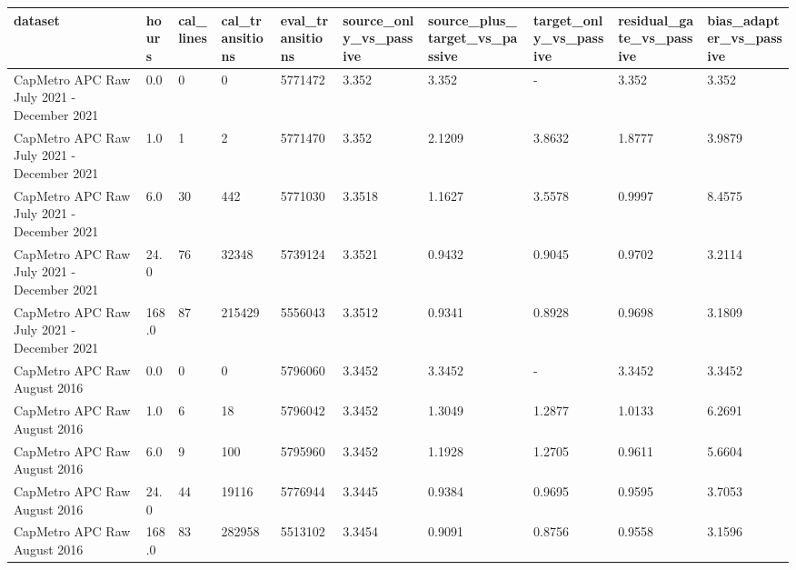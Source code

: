 \begin{tabular}{llllllllll}
\toprule
dataset & hours & cal\_lines & cal\_transitions & eval\_transitions & source\_only\_vs\_passive & source\_plus\_target\_vs\_passive & target\_only\_vs\_passive & residual\_gate\_vs\_passive & bias\_adapter\_vs\_passive \\
\midrule
CapMetro APC Raw July 2021 - December 2021 & 0.0 & 0 & 0 & 5771472 & 3.352 & 3.352 & - & 3.352 & 3.352 \\
CapMetro APC Raw July 2021 - December 2021 & 1.0 & 1 & 2 & 5771470 & 3.352 & 2.1209 & 3.8632 & 1.8777 & 3.9879 \\
CapMetro APC Raw July 2021 - December 2021 & 6.0 & 30 & 442 & 5771030 & 3.3518 & 1.1627 & 3.5578 & 0.9997 & 8.4575 \\
CapMetro APC Raw July 2021 - December 2021 & 24.0 & 76 & 32348 & 5739124 & 3.3521 & 0.9432 & 0.9045 & 0.9702 & 3.2114 \\
CapMetro APC Raw July 2021 - December 2021 & 168.0 & 87 & 215429 & 5556043 & 3.3512 & 0.9341 & 0.8928 & 0.9698 & 3.1809 \\
CapMetro APC Raw August 2016 & 0.0 & 0 & 0 & 5796060 & 3.3452 & 3.3452 & - & 3.3452 & 3.3452 \\
CapMetro APC Raw August 2016 & 1.0 & 6 & 18 & 5796042 & 3.3452 & 1.3049 & 1.2877 & 1.0133 & 6.2691 \\
CapMetro APC Raw August 2016 & 6.0 & 9 & 100 & 5795960 & 3.3452 & 1.1928 & 1.2705 & 0.9611 & 5.6604 \\
CapMetro APC Raw August 2016 & 24.0 & 44 & 19116 & 5776944 & 3.3445 & 0.9384 & 0.9695 & 0.9595 & 3.7053 \\
CapMetro APC Raw August 2016 & 168.0 & 83 & 282958 & 5513102 & 3.3454 & 0.9091 & 0.8756 & 0.9558 & 3.1596 \\
\bottomrule
\end{tabular}

